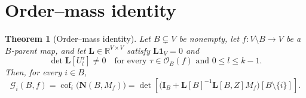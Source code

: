 \documentclass[11pt]{article}
\newtheorem{theorem}[definition]{Theorem}
\newcommand{\R}{\mathbb R}
\newcommand{\one}{\mathbf 1}
\newcommand{\Id}{\mathbf I}
\newcommand{\Lmat}{\mathbf L}
\newcommand{\Nmat}{\mathbf N}
\newcommand{\Ord}{\mathcal O}
\newcommand{\cof}{\operatorname{cof}}
\begin{document}
\section{Order--mass identity}

\begin{theorem}[Order--mass identity]\label{thm:order-mass}
Let $B\subsetneq V$ be nonempty, let $f:V\setminus B\to V$ be a
$B$-parent map, and let $\Lmat\in\R^{V\times V}$ satisfy
$\Lmat\one_V=0$ and
\begin{equation}\label{eq:minor-hypothesis}
\det\Lmat[U_l^{\tau}]\neq0
\quad\text{for every }\tau\in\Ord_B(f)
\text{ and }0\leq l\leq k-1.
\end{equation}
Then, for every $i\in B$,
\begin{equation}\label{eq:order-mass}
\mathcal G_i(B,f)
=\cof_i\bigl(\Nmat(B,M_f)\bigr)
=\det\!\left[
  \bigl(\Id_B+\Lmat[B]^{-1}\Lmat[B,Z]M_f\bigr)
    [B\setminus\{i\}]
  \right].
\end{equation}
\end{theorem}
\end{document}
